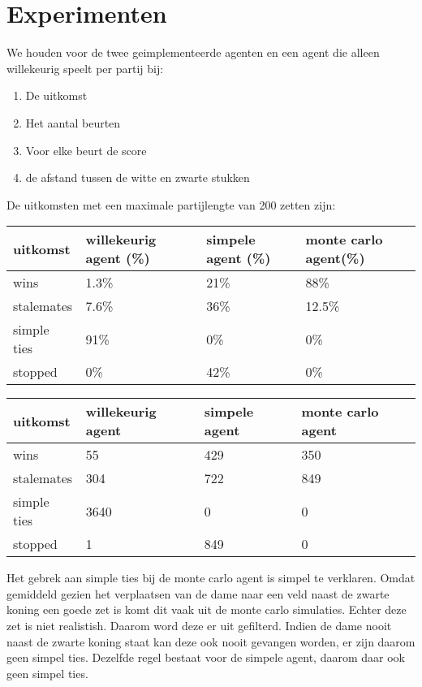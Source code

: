 \documentclass[10pt]{article}
\begin{document}
\bigskip



\section{Experimenten}

We houden voor de twee geimplementeerde agenten en een agent die alleen willekeurig speelt per partij bij:
\begin{enumerate}
\item De uitkomst
\item Het aantal beurten
\item Voor elke beurt de score
\item de afstand tussen de witte en zwarte stukken
\end{enumerate}

De uitkomsten met een maximale partijlengte van 200 zetten zijn:
\begin{center}
\begin{tabular}{l|l|l|l}
 uitkomst & willekeurig agent (\%)& simpele agent (\%) & monte carlo agent(\%)\\
\hline
wins &1.3\% & 21\% & 88\%\\
stalemates &7.6\% & 36\% & 12.5\%\\
simple ties &91\% & 0\% & 0\%\\
stopped &0\% &42\% & 0\%\\
\end{tabular}
\end{center}

\begin{center}
\begin{tabular}{l|l|l|l}
 uitkomst & willekeurig agent& simpele agent & monte carlo agent\\
\hline
wins & 55 & 429 & 350\\
stalemates & 304 & 722 & 849\\
simple ties & 3640 & 0 & 0\\
stopped &1 &849 & 0\\
\end{tabular}
\end{center}

Het gebrek aan simple ties bij de monte carlo agent is simpel te verklaren. Omdat gemiddeld gezien het verplaatsen van de dame naar een veld naast de zwarte koning een goede zet is komt dit vaak uit de monte carlo simulaties. Echter deze zet is niet realistish. Daarom word deze er uit gefilterd. Indien de dame nooit naast de zwarte koning staat kan deze ook nooit gevangen worden, er zijn daarom geen simpel ties. Dezelfde regel bestaat voor de simpele agent, daarom daar ook geen simpel ties.
\end{document}

